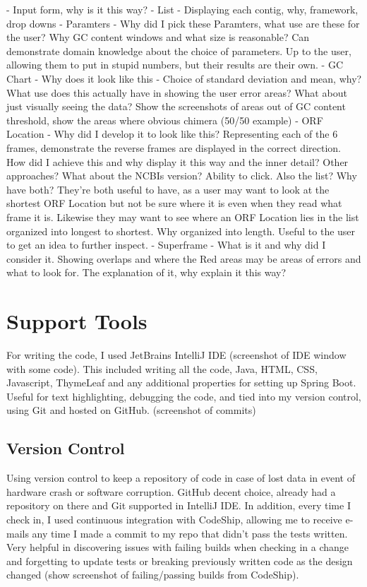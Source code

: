 - Input form, why is it this way?
- List - Displaying each contig, why, framework, drop downs
- Paramters - Why did I pick these Paramters, what use are these for the user? Why GC content windows and what size is reasonable? Can demonstrate domain knowledge about the choice of parameters. Up to the user, allowing them to put in stupid numbers, but their results are their own.
- GC Chart - Why does it look like this - Choice of standard deviation and mean, why? What use does this actually have  in showing the user error areas? What about just visually seeing the data? Show the screenshots of areas out of GC content threshold, show the areas where obvious chimera (50/50 example)
- ORF Location - Why did I develop it to look like this? Representing each of the 6 frames, demonstrate the reverse frames are displayed in the correct direction. How did I achieve this and why display it this way and the inner detail? Other approaches? What about the NCBIs version? Ability to click. Also the list? Why have both? They're both useful to have, as a user may want to look at the shortest ORF Location but not be sure where it is even when they read what frame it is. Likewise they may want to see where an ORF Location lies in the list organized into longest to shortest. Why organized into length. Useful to the user to get an idea to further inspect.
- Superframe - What is it and why did I consider it. Showing overlaps and where the Red areas may be areas of errors and what to look for. The explanation of it, why explain it this way? 

\section{Support Tools}
For writing the code, I used JetBrains IntelliJ IDE (screenshot of IDE window with some code). This included writing all the code, Java, HTML, CSS, Javascript, ThymeLeaf and any additional properties for setting up Spring Boot. Useful for text highlighting, debugging the code, and tied into my version control, using Git and hosted on GitHub. (screenshot of commits)
\subsection{Version Control}
Using version control to keep a repository of code in case of lost data in event of hardware crash or software corruption. GitHub decent choice, already had a repository on there and Git supported in IntelliJ IDE. In addition, every time I check in, I used continuous integration with CodeShip, allowing me to receive e-mails any time I made a commit to my repo that didn't pass the tests written. Very helpful in discovering issues with failing builds when checking in a change and forgetting to update tests or breaking previously written code as the design changed (show screenshot of failing/passing builds from CodeShip).